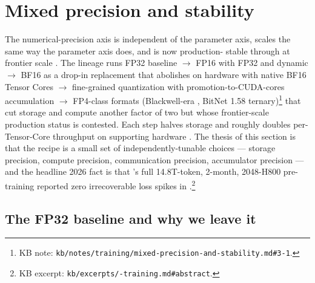 
\section{Mixed precision and stability}
\label{sec:mixed-precision}

The numerical-precision axis is independent of the parameter axis,
scales the same way the parameter axis does, and is now production-
stable through  at frontier scale \citep[\S 3.3]{deepseek-v3}.
The lineage runs FP32 baseline $\to$ FP16 with FP32  and
dynamic  \citep{micikevicius2017-mixed-precision}
$\to$ BF16 as a drop-in replacement that abolishes  on
hardware with native BF16 Tensor Cores \citep{kalamkar2019-bfloat16}
$\to$  fine-grained quantization with promotion-to-CUDA-cores
accumulation \citep[\S 3.3]{deepseek-v3} $\to$ FP4-class formats
(Blackwell-era , BitNet 1.58 ternary)\footnote{KB note:
\texttt{kb/notes/training/mixed-precision-and-stability.md\#3-1}.} that
cut storage and compute another factor of two but whose frontier-scale
production status is contested. Each step halves storage and roughly
doubles per-Tensor-Core throughput on supporting hardware
\citep[\S 3.3]{deepseek-v3}. The thesis of this section is that the
recipe is a small set of independently-tunable choices — storage
precision, compute precision, communication precision, accumulator
precision — and the headline 2026 fact is that 's full
14.8T-token, 2-month, 2048-H800 pre-training reported zero
irrecoverable loss spikes in 
\citep[abstract]{deepseek-v3}.\footnote{KB excerpt:
\texttt{kb/excerpts/-training.md\#abstract}.}

\subsection{The FP32 baseline and why we leave it}
\label{sec:mp-fp32}

